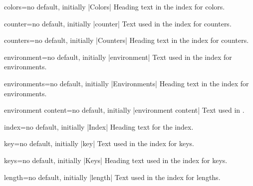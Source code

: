 \begin{langTcbKey}{colors}{=}{no default, initially |Colors|}
  Heading text in the index for colors.
\end{langTcbKey}

\begin{langTcbKey}[][doc new={2015-01-08}]{counter}{=}{no default, initially |counter|}
  Text used in the index for counters.
\end{langTcbKey}

\begin{langTcbKey}[][doc new={2015-01-08}]{counters}{=}{no default, initially |Counters|}
  Heading text in the index for counters.
\end{langTcbKey}

\begin{langTcbKey}{environment}{=}{no default, initially |environment|}
  Text used in the index for environments.
\end{langTcbKey}

\begin{langTcbKey}{environments}{=}{no default, initially |Environments|}
  Heading text in the index for environments.
\end{langTcbKey}

\begin{langTcbKey}{environment content}{=}{no default, initially |environment content|}
  Text used in .
\end{langTcbKey}

\begin{langTcbKey}{index}{=}{no default, initially |Index|}
  Heading text for the index.
\end{langTcbKey}

\begin{langTcbKey}{key}{=}{no default, initially |key|}
  Text used in the index for keys.
\end{langTcbKey}

\begin{langTcbKey}{keys}{=}{no default, initially |Keys|}
  Heading text used in the index for keys.
\end{langTcbKey}

\begin{langTcbKey}[][doc new={2015-01-08}]{length}{=}{no default, initially |length|}
  Text used in the index for lengths.
\end{langTcbKey}

